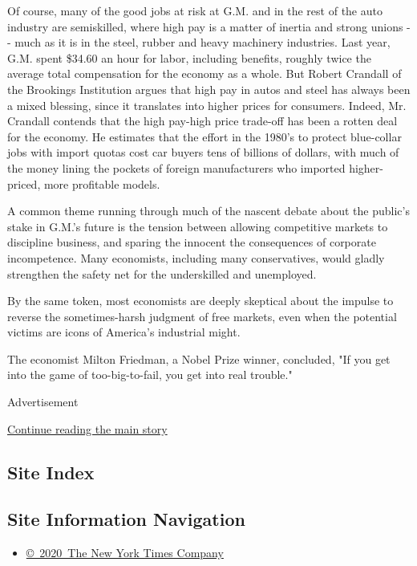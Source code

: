 Of course, many of the good jobs at risk at G.M. and in the rest of the
auto industry are semiskilled, where high pay is a matter of inertia and
strong unions -\/- much as it is in the steel, rubber and heavy
machinery industries. Last year, G.M. spent \$34.60 an hour for labor,
including benefits, roughly twice the average total compensation for the
economy as a whole. But Robert Crandall of the Brookings Institution
argues that high pay in autos and steel has always been a mixed
blessing, since it translates into higher prices for consumers. Indeed,
Mr. Crandall contends that the high pay-high price trade-off has been a
rotten deal for the economy. He estimates that the effort in the 1980's
to protect blue-collar jobs with import quotas cost car buyers tens of
billions of dollars, with much of the money lining the pockets of
foreign manufacturers who imported higher-priced, more profitable
models.

A common theme running through much of the nascent debate about the
public's stake in G.M.'s future is the tension between allowing
competitive markets to discipline business, and sparing the innocent the
consequences of corporate incompetence. Many economists, including many
conservatives, would gladly strengthen the safety net for the
underskilled and unemployed.

By the same token, most economists are deeply skeptical about the
impulse to reverse the sometimes-harsh judgment of free markets, even
when the potential victims are icons of America's industrial might.

The economist Milton Friedman, a Nobel Prize winner, concluded, "If you
get into the game of too-big-to-fail, you get into real trouble."

Advertisement

\protect\hyperlink{after-bottom}{Continue reading the main story}

\hypertarget{site-index}{%
\subsection{Site Index}\label{site-index}}

\hypertarget{site-information-navigation}{%
\subsection{Site Information
Navigation}\label{site-information-navigation}}

\begin{itemize}
\tightlist
\item
  \href{https://help.nytimes3xbfgragh.onion/hc/en-us/articles/115014792127-Copyright-notice}{©~2020~The
  New York Times Company}
\end{itemize}

